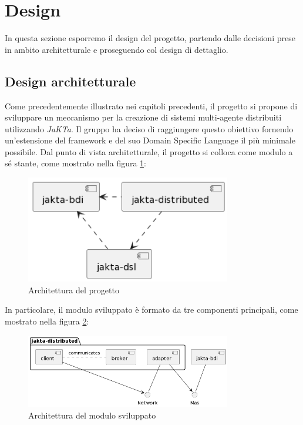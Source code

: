 \section{Design}
In questa sezione esporremo il design del progetto, partendo dalle decisioni prese in ambito architetturale e proseguendo
col design di dettaglio.

\subsection{Design architetturale}
Come precedentemente illustrato nei capitoli precedenti, il progetto si propone di sviluppare un meccanismo per la creazione di sistemi multi-agente distribuiti utilizzando \textit{JaKTa}.
Il gruppo ha deciso di raggiungere questo obiettivo fornendo un'estensione del framework e del suo Domain Specific Language il più minimale possibile.
Dal punto di vista architetturale, il progetto si colloca come modulo a sé stante, come mostrato nella figura \ref{fig:architecture}:

\begin{figure}[ht!]
    \centering
    \includegraphics[width=0.8\textwidth]{figures/general-architecture.png}
    \caption{Architettura del progetto}
    \label{fig:architecture}
\end{figure}

In particolare, il modulo sviluppato è formato da tre componenti principali, come mostrato nella figura \ref{fig:detailed-architecture}:

\begin{figure}[ht!]
    \centering
    \includegraphics[width=0.8\textwidth]{figures/detailed-architecture.png}
    \caption{Architettura del modulo sviluppato}
    \label{fig:detailed-architecture}
\end{figure}

